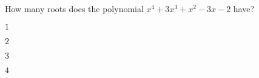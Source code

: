 \documentclass{article}
\begin{document}
\begin{readinessAssuranceTest}
\item How many roots does the polynomial $x^4+3x^3+x^2-3x-2$ have?
\begin{multicols}{4}
\begin{readinessAssuranceTestChoices}
\item $1$
\item $2$
\item $3$
\item $4$
\end{readinessAssuranceTestChoices}
\end{multicols}

\end{readinessAssuranceTest}
\end{document}
